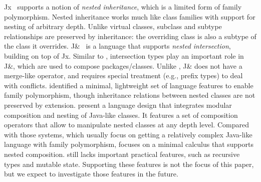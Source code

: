 Jx~\citep{Nystrom_2004} supports a notion of \textit{nested inheritance}, which
is a limited form of family polymorphism. Nested inheritance works much like
class families with support for nesting of arbitrary depth. Unlike virtual
classes, subclass and subtype relationships are preserved by inheritance: the
overriding class is also a subtype of the class it overrides.
J\&~\citep{Nystrom:2006:JNI:1167473.1167476} is a language that supports
\textit{nested intersection}, building on top of Jx. Similar to \name,
intersection types play an important role in J\&, which are used to compose
packages/classes. Unlike \name, J\& does not have a merge-like operator, and
requires special treatment (e.g., prefix types) to deal with conflicts.
\citet{SAITO_2007} identified a minimal, lightweight set of language features
to enable family polymorphism, though inheritance relations between nested
classes are not preserved by extension. \citet{Corradi_2012} present a language
design that integrates modular composition and nesting of Java-like classes. It
features a set of composition operators that allow to manipulate nested classes
at any depth level. Compared with those systems, which usually focus on getting
a relatively complex Java-like language with family polymorphism,
\name focuses on a minimal calculus that supports
nested composition. \name still lacks important practical features, such as
recursive types and mutable state. Supporting these features is not the
focus of this paper, but we expect to investigate those features in the future.




